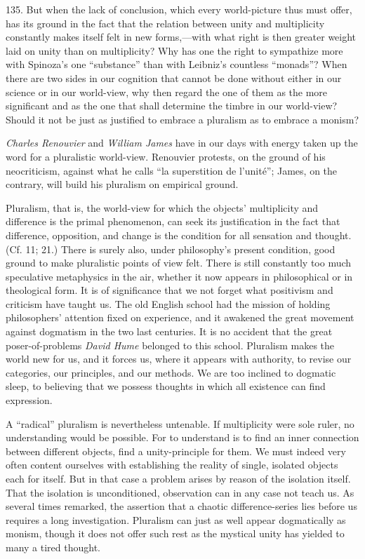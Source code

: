\documentclass[12pt,a4paper]{book}
\newcommand{\opage}[1]{\marginnote{\footnotesize\textit{[#1]}}}
\begin{document}
135. But when the lack of conclusion, which every world-picture thus must offer, has its ground in
the fact that the relation between unity and multiplicity constantly makes itself felt in new
forms,---with what right is then greater weight laid on unity than on multiplicity? Why has one the
right to sympathize more with Spinoza's one ``substance'' than with Leibniz's countless ``monads''?
When there are two sides in our cognition that cannot be done without either in our science or in our
world-view, why then regard the one of them as the more significant and as the one that shall
determine the timbre in our world-view? Should it not be just as justified to embrace a pluralism as
to embrace a monism?

\emph{Charles Renouvier} and \emph{William James} have in our days with energy taken up the word for a
pluralistic world-view. Renouvier protests, on the ground of his neocriticism, against what he calls
``la superstition de l'unité''; James, on the contrary, will build his pluralism on empirical ground.

Pluralism, that is, the world-view for which the objects' multiplicity and difference is the primal
phenomenon, can seek its justification in the fact that difference, opposition, and change is the
condition for all sensation and thought. (Cf. 11; 21.) There is surely also, under philosophy's
present condition, good ground to make pluralistic points of view felt. There is still constantly too
much speculative metaphysics \opage{324}in the air, whether it now appears in philosophical or in theological
form. It is of significance that we not forget what positivism and criticism have taught us. The old
English school had the mission of holding philosophers' attention fixed on experience, and it awakened
the great movement against dogmatism in the two last centuries. It is no accident that the great
poser-of-problems \emph{David Hume} belonged to this school. Pluralism makes the world new for us, and
it forces us, where it appears with authority, to revise our categories, our principles, and our
methods. We are too inclined to dogmatic sleep, to believing that we possess thoughts in which all
existence can find expression.

A ``radical'' pluralism is nevertheless untenable. If multiplicity were sole ruler, no understanding
would be possible. For to understand is to find an inner connection between different objects, find a
unity-principle for them. We must indeed very often content ourselves with establishing the reality of
single, isolated objects each for itself. But in that case a problem arises by reason of the isolation
itself. That the isolation is unconditioned, observation can in any case not teach us. As several times
remarked, the assertion that a chaotic difference-series lies before us requires a long investigation.
Pluralism can just as well appear dogmatically as monism, though it does not offer such rest as the
mystical unity has yielded to many a tired thought.
\end{document}
